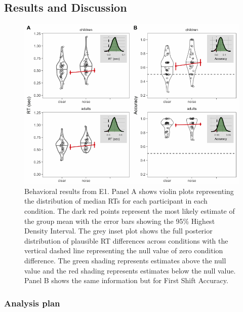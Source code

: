 \documentclass[10pt, letterpaper]{article}
\newenvironment{CodeChunk}{}{}
\begin{document}
\subsection{Results and Discussion}\label{results-and-discussion}

\begin{CodeChunk}
\begin{figure}[t]

{\centering \includegraphics[width=0.8\linewidth]{figs/noise_acc_rt_e1_plot-1} 

}

\caption[Behavioral results from E1]{Behavioral results from E1. Panel A shows violin plots representing the distribution of median RTs for each participant in each condition. The dark red points represent the most likely estimate of the group mean with the error bars showing the 95\% Highest Density Interval. The grey inset plot shows the full posterior distribution of plausible RT differences across conditions with the vertical dashed line representing the null value of zero condition difference. The green shading represents estimates above the null value and the red shading represents estimates below the null value. Panel B shows the same information but for First Shift Accuracy.}\label{fig:noise_acc_rt_e1_plot}
\end{figure}
\end{CodeChunk}

\subsubsection{Analysis plan}\label{analysis-plan}
\end{document}
